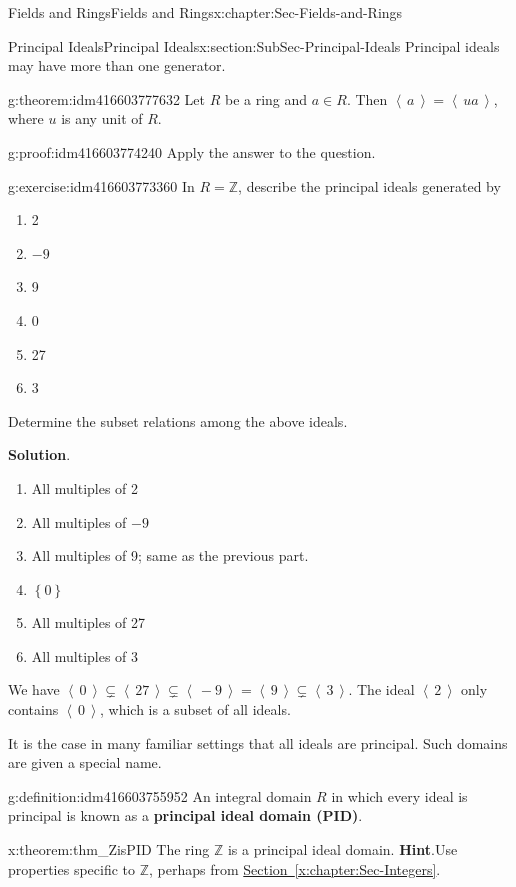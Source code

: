 \documentclass[oneside,10pt,]{book}
\newcommand{\terminology}[1]{\textbf{#1}}
\numberwithin{equation}{section}
\newcommand{\ideal}[1]{\left\langle\, #1 \,\right\rangle}
\newcommand{\set}[1]{\left\{ {#1} \right\}}
\def\Z{{\mathbb Z}}
\begin{document}
\begin{chapterptx}{Fields and Rings}{}{Fields and Rings}{}{}{x:chapter:Sec-Fields-and-Rings}
\begin{sectionptx}{Principal Ideals}{}{Principal Ideals}{}{}{x:section:SubSec-Principal-Ideals}
Principal ideals may have more than one generator.%
\begin{theorem}{}{}{g:theorem:idm416603777632}%
Let \(R\) be a ring and \(a\in R\). Then \(\ideal{a} = \ideal{ua}\), where \(u\) is any unit of \(R\).%
\end{theorem}
\begin{proofptx}{}{g:proof:idm416603774240}
Apply the answer to the question.%
\end{proofptx}
\begin{inlineexercise}{}{g:exercise:idm416603773360}%
In \(R = \Z\), describe the principal ideals generated by%
\begin{enumerate}
\item{}2%
\item{}\(-9\)%
\item{}9%
\item{}0%
\item{}27%
\item{}3%
\end{enumerate}
%
\par
Determine the subset relations among the above ideals.%
\par\smallskip%
\noindent\textbf{Solution}.\hypertarget{g:solution:idm416603765312}{}\quad{}%
\begin{enumerate}
\item{}All multiples of 2%
\item{}All multiples of \(-9\)%
\item{}All multiples of 9; same as the previous part.%
\item{}\(\set{0}\)%
\item{}All multiples of 27%
\item{}All multiples of 3%
\end{enumerate}
We have \(\ideal{0}\subsetneq \ideal{27}\subsetneq \ideal{-9} = \ideal{9} \subsetneq \ideal{3}\). The ideal \(\ideal{2}\) only contains \(\ideal{0}\), which is a subset of all ideals.%
\end{inlineexercise}
It is the case in many familiar settings that all ideals are principal. Such domains are given a special name.%
\begin{definition}{}{g:definition:idm416603755952}%
An integral domain \(R\) in which every ideal is principal is known as a \terminology{principal ideal domain (PID)}.%
\end{definition}
\begin{theorem}{}{}{x:theorem:thm_ZisPID}%
The ring \(\Z\) is a principal ideal domain.%
\textbf{Hint}.\quad{}Use properties specific to \(\Z\), perhaps from \hyperref[x:chapter:Sec-Integers]{Section~\ref{x:chapter:Sec-Integers}}.%

\end{theorem}
\end{sectionptx}
\end{chapterptx}
\end{document}
